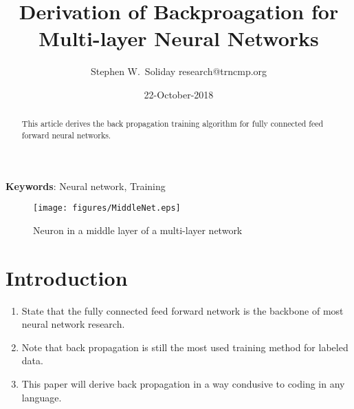 \documentclass{article}
\begin{document}
\title{Derivation of Backproagation for Multi-layer Neural Networks}
\author{ \name Stephen W.~Soliday \email research@trncmp.org %
}
\date{22-October-2018}

\maketitle

\begin{abstract}%

  This article derives the back propagation training algorithm for fully
  connected feed forward neural networks.
  
\end{abstract}

\vspace{12pt}
\textbf{Keywords}: Neural network, Training

\begin{figure}[h]
  \begin{center}
    \texttt{[image: figures/MiddleNet.eps]}
    \caption{Neuron in a middle layer of a multi-layer network}
    \label{fig:midlayer}
  \end{center}
\end{figure}

\section{Introduction\label{sec:intro}}

\begin{enumerate}
  
\item State that the fully connected feed forward network is the
      backbone of most neural network research.
\item Note that back propagation is still the most used training
      method for labeled data.
\item This paper will derive back propagation in a way condusive
      to coding in any language.
\end{enumerate}
\end{document}

